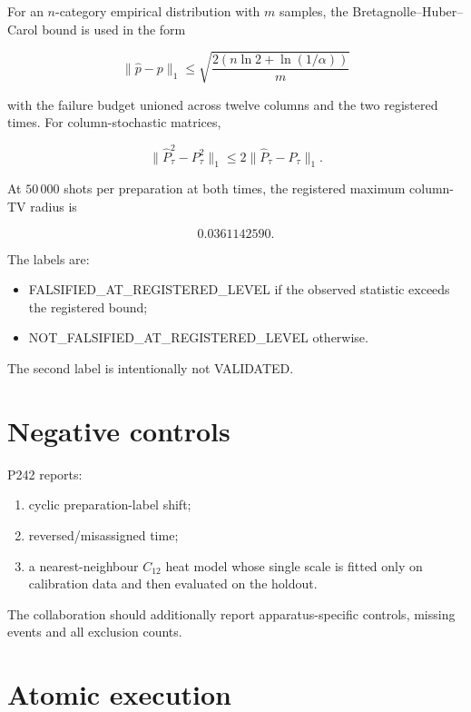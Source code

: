 \documentclass[11pt,a4paper,openany]{report}
\begin{document}
For an \(n\)-category empirical distribution with \(m\) samples, the Bretagnolle--Huber--Carol bound is used in the form

\[
\|\widehat p-p\|_1
\leq
\sqrt{
\frac{2\left(n\ln2+\ln(1/\alpha)\right)}{m}
}
\]

with the failure budget unioned across twelve columns and the two registered times. For column-stochastic matrices,

\[
\|\widehat P_\tau^2-P_\tau^2\|_1
\leq
2\|\widehat P_\tau-P_\tau\|_1.
\]

At \(50\,000\) shots per preparation at both times, the registered maximum column-TV radius is

\[
0.0361142590.
\]

The labels are:

\begin{itemize}
\item 
FALSIFIED\_AT\_REGISTERED\_LEVEL if the observed statistic exceeds the registered bound;

\item 
NOT\_FALSIFIED\_AT\_REGISTERED\_LEVEL otherwise.

\end{itemize}

The second label is intentionally not VALIDATED.

\section{Negative controls}

P242 reports:

\begin{enumerate}
\item 
cyclic preparation-label shift;

\item 
reversed/\allowbreak{}misassigned time;

\item 
a nearest-neighbour \(C_{12}\) heat model whose single scale is fitted only on calibration data and then evaluated on the holdout.

\end{enumerate}

The collaboration should additionally report apparatus-specific controls, missing events and all exclusion counts.

\section{Atomic execution}
\end{document}
